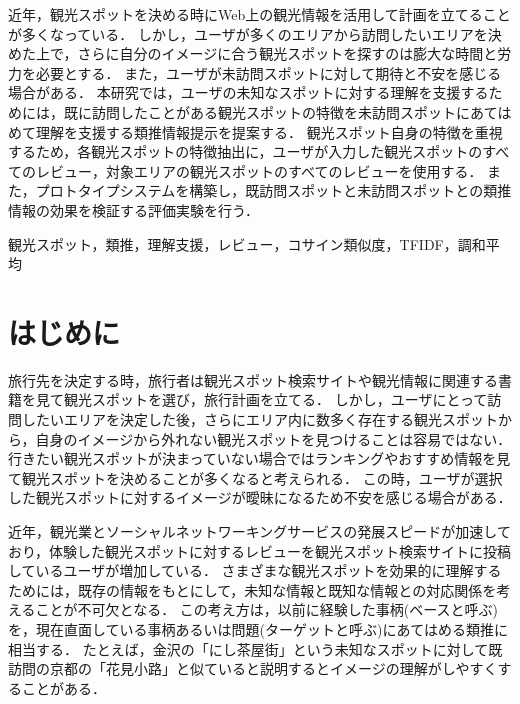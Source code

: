 \documentclass{deimj}
\begin{document}
\pagestyle{empty}
\begin{jabstract}
近年，観光スポットを決める時にWeb上の観光情報を活用して計画を立てることが多くなっている．
しかし，ユーザが多くのエリアから訪問したいエリアを決めた上で，さらに自分のイメージに合う観光スポットを探すのは膨大な時間と労力を必要とする．
また，ユーザが未訪問スポットに対して期待と不安を感じる場合がある．
本研究では，ユーザの未知なスポットに対する理解を支援するためには，既に訪問したことがある観光スポットの特徴を未訪問スポットにあてはめて理解を支援する類推情報提示を提案する．
観光スポット自身の特徴を重視するため，各観光スポットの特徴抽出に，ユーザが入力した観光スポットのすべてのレビュー，対象エリアの観光スポットのすべてのレビューを使用する．
また，プロトタイプシステムを構築し，既訪問スポットと未訪問スポットとの類推情報の効果を検証する評価実験を行う．
\end{jabstract}

\begin{jkeyword}
観光スポット，類推，理解支援，レビュー，コサイン類似度，TFIDF，調和平均
\end{jkeyword}
\maketitle


\section{はじめに}
\label{sec:Introduction}
旅行先を決定する時，旅行者は観光スポット検索サイトや観光情報に関連する書籍を見て観光スポットを選び，旅行計画を立てる．
しかし，ユーザにとって訪問したいエリアを決定した後，さらにエリア内に数多く存在する観光スポットから，自身のイメージから外れない観光スポットを見つけることは容易ではない．
行きたい観光スポットが決まっていない場合ではランキングやおすすめ情報を見て観光スポットを決めることが多くなると考えられる．
この時，ユーザが選択した観光スポットに対するイメージが曖昧になるため不安を感じる場合がある．

近年，観光業とソーシャルネットワーキングサービスの発展スピードが加速しており，体験した観光スポットに対するレビューを観光スポット検索サイトに投稿しているユーザが増加している．
さまざまな観光スポットを効果的に理解するためには，既存の情報をもとにして，未知な情報と既知な情報との対応関係を考えることが不可欠となる．
この考え方は，以前に経験した事柄(ベースと呼ぶ)を，現在直面している事柄あるいは問題(ターゲットと呼ぶ)にあてはめる類推に相当する．
たとえば，金沢の「にし茶屋街」という未知なスポットに対して既訪問の京都の「花見小路」と似ていると説明するとイメージの理解がしやすくすることがある．
\end{document}

